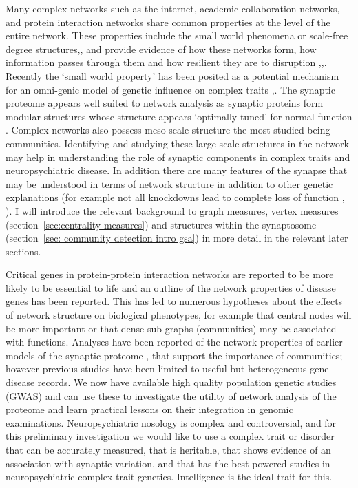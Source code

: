 Many complex networks such as the internet, academic collaboration networks, and protein interaction networks share common properties at the level of the entire network. These properties include the small world phenomena or scale-free degree structures\cite{barabasi1999emergence},\cite{watts1998collective},  and provide evidence of how these networks form, how information passes through them and how resilient they are to disruption \cite{rosvall2008maps},\cite{albert2000error},\cite{bianconi2001competition}.  Recently the `small world property’ has been posited as a potential mechanism for an omni-genic model of genetic influence on complex traits \cite{watts1998collective},\cite{boyle2017expanded}. 
The synaptic proteome appears well suited to network analysis as synaptic proteins form modular structures \cite{pocklington2006proteomes} whose structure appears ‘optimally tuned’ for normal function \cite{grant2012synaptopathies}. Complex networks also possess meso-scale structure the most studied being communities. Identifying and studying these large scale structures in the network may help in understanding the role of synaptic components in complex traits and neuropsychiatric disease. In addition there are many features of the synapse that may be understood in terms of network structure in addition to other genetic explanations (for example  not all knockdowns lead to complete loss of function \cite{keverne1997evaluation},  \cite{charlesworth2016canalization}). I will introduce the relevant background to graph measures, vertex measures (section~\ref{sec:centrality measures}) and structures within the synaptosome (section~\ref{sec: community detection intro gsa}) in more detail in the relevant later sections.

 Critical genes in protein-protein interaction networks are reported to be more likely to be essential to life\cite{jeong2001lethality} and an outline of the network properties of disease genes\cite{barabasi2011network} has been reported. This has led to numerous hypotheses about the effects of network structure on biological phenotypes, for example that central nodes will be more important or that dense sub
 graphs (communities) may be associated with functions. 
Analyses have been reported of the network properties of earlier models of the synaptic proteome  \cite{pocklington2006organization},\cite{mclean2016improved} that support the importance of communities; however previous studies have been limited to useful but heterogeneous gene-disease records. We now have available high quality population genetic studies (GWAS) and can use these to investigate the utility of network analysis of the proteome and learn practical lessons on their integration in genomic examinations. Neuropsychiatric nosology is complex and controversial, and for this preliminary investigation we would like to use a complex trait or disorder that can be accurately measured, that is heritable, that shows evidence of an association with synaptic variation, and that has the best powered studies in neuropsychiatric complex trait genetics. Intelligence is the ideal trait for this. 


